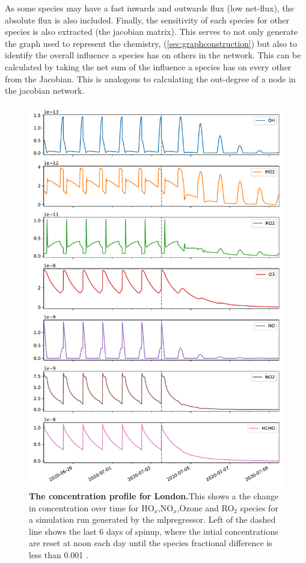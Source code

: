 As some species may have a fast inwards and outwards flux (low net-flux), the absolute flux is also included. Finally, the sensitivity of each species for other species is also extracted (the jacobian matrix). This serves to not only generate the graph used to represent the chemistry, (\autoref{sec:graphconstruction}) but also to identify the overall influence a species has on others in the network. This can be calculated by taking the net sum of the influence a species has on every other from the Jacobian. This is analogous to calculating the out-degree of a node in the jacobian network.\\



%

%
%
%



\begin{figure}[H]
    \centering
\includegraphics[width=.9\textwidth]{figures_c3/mlpregressor/conc_clfo.pdf}
\caption{\textbf{The concentration profile for London.}This shows a the change in concentration over time for HO$_x$,NO$_x$,Ozone and RO$_2$ species for a simulation run generated by the mlpregressor. Left of the dashed line shows the last 6 days of spinup, where the intial concentrations are reset at noon each day until the species fractional difference is less than 0.001 .}
\label{fig:clondon}
\end{figure}

